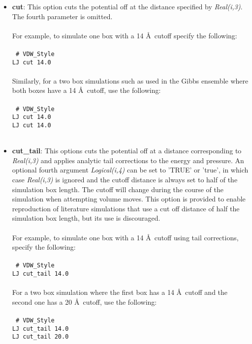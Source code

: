 \begin{itemize}
\item \textbf{cut}: This option cuts the  potential  off at the  distance
specified by \emph{Real(i,3)}. The fourth parameter is omitted. \\ \\
%
For example, to simulate one box with a 14 \AA\ cutoff specify the following:
\\ \\
\texttt{
\# VDW\_Style \\
LJ cut 14.0 } \\ \\
%
Similarly, for a two box simulations such as used in the Gibbs
ensemble where both boxes have a 14 \AA\ cutoff, use the
following: \\ \\
\texttt{
\# VDW\_Style \\
LJ cut 14.0 \\
LJ cut 14.0 } \\ \\
%
\item \textbf{cut\_tail}: This options cuts the potential off at a distance
corresponding to \emph{Real(i,3)} and applies analytic tail
corrections to the energy and pressure. An optional fourth argument
\emph{Logical(i,4)} can be set 
to 'TRUE' or 'true', in which case \emph{Real(i,3)} is ignored and the cutoff
distance is always set to half of the simulation box length. The
cutoff will change during the course of the simulation when attempting
volume moves.  This option is provided to enable reproduction of
literature simulations that use a cut off distance of half the
simulation box length, but its use is discouraged. \\ \\ 
%
For example, to simulate one box with a 14 \AA\ cutoff using tail
corrections, specify the following:
\\ \\
\texttt{
\# VDW\_Style \\
LJ cut\_tail 14.0 } \\ \\
%
For a two box simulation where the first box has a 14 \AA\ cutoff and
the second one has a 20 \AA\ cutoff, use the
following:
\\ \\
\texttt{
\# VDW\_Style \\
LJ cut\_tail 14.0 \\ 
LJ cut\_tail 20.0 } \\ \\

\end{itemize}

